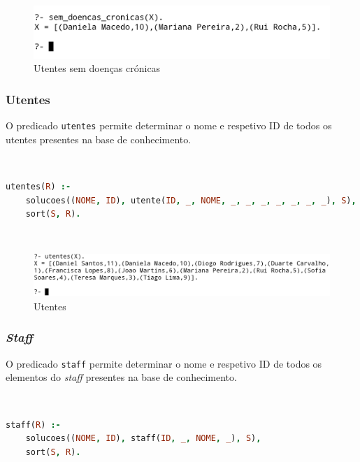 \documentclass[a4paper, 11pt]{article}
\begin{document}
\begin{figure}[H]
    \centering
    \includegraphics[width=.8\textwidth]{img/sem_doencas_cronicas.png}
    \caption{Utentes sem doenças crónicas}
\end{figure}

\subsubsection{Utentes}

O predicado \texttt{utentes} permite determinar o nome e respetivo ID de todos os utentes presentes na base de
conhecimento.

\

\begin{lstlisting}[language=Prolog, caption={Extensão do predicado \texttt{utentes}}]
% Extensao do predicado utentes: R -> {V, F}
utentes(R) :-  
    solucoes((NOME, ID), utente(ID, _, NOME, _, _, _, _, _, _, _), S),
    sort(S, R).
\end{lstlisting}

\

\begin{figure}[H]
    \centering
    \includegraphics[width=\textwidth]{img/utentes.png}
    \caption{Utentes}
\end{figure}

\subsubsection{\textit{Staff}}

O predicado \texttt{staff} permite determinar o nome e respetivo ID de todos os elementos do \textit{staff} presentes
na base de conhecimento.

\

\begin{lstlisting}[language=Prolog, caption={Extensão do predicado \texttt{staff}}]
% Extensao do predicado staff: R -> {V, F}
staff(R) :- 
    solucoes((NOME, ID), staff(ID, _, NOME, _), S),
    sort(S, R).
\end{lstlisting}
\end{document}

